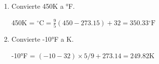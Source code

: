 \documentclass[a4paper, 11pt]{article}
\newcommand{\Pspace}{0.5cm}
\newcommand{\Aspace}{0.2cm}
\begin{document}
\begin{enumerate}
    \vspace{\Pspace}
    \item Convierte 450K a °F. \par
        \vspace{\Aspace} \par
        { \color{azul} 450K = $\mathrm{^\circ C} = \frac{9}{5} (450 - 273.15) + 32 = 350.33 \mathrm{^\circ F}$ }



    \vspace{\Pspace}
    \item Convierte -10°F a K. \par
        \vspace{\Aspace} \par
        { \color{azul} -10°F = $(-10 - 32) \times 5/9 + 273.14 = 249.82$K }
    \end{enumerate}
\end{document}
